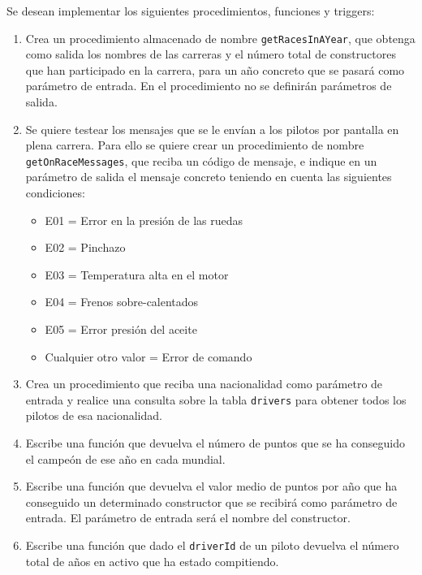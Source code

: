 \documentclass[a4paper]{article}
\begin{document}
Se desean implementar los siguientes procedimientos, funciones y triggers:

\begin{enumerate}
    \item Crea un procedimiento almacenado de nombre \texttt{getRacesInAYear}, que obtenga como salida los nombres de las carreras y el número total de constructores que han participado en la carrera, para un año concreto que se pasará como parámetro de entrada. En el procedimiento no se definirán parámetros de salida.  
    
    \item Se quiere testear los mensajes que se le envían a los pilotos por pantalla en plena carrera. Para ello se quiere crear un procedimiento de nombre \texttt{getOnRaceMessages}, que reciba un código de mensaje, e indique en un parámetro de salida el mensaje concreto teniendo en cuenta las siguientes condiciones:
    \begin{itemize}
        \item E01 = Error en la presión de las ruedas
        \item E02 = Pinchazo
        \item E03 = Temperatura alta en el motor
        \item E04 = Frenos sobre-calentados
        \item E05 = Error presión del aceite
        \item Cualquier otro valor = Error de comando
    \end{itemize}
            
    \item Crea un procedimiento que reciba una nacionalidad como parámetro de entrada y realice una consulta sobre la tabla \texttt{drivers} para obtener todos los pilotos de esa nacionalidad.
       
    \item Escribe una función que devuelva el número de puntos que se ha conseguido el campeón de ese año en cada mundial.
           
    \item Escribe una función que devuelva el valor medio de puntos por año que ha conseguido un determinado constructor que se recibirá como parámetro de entrada. El parámetro de entrada será el nombre del constructor.
            
    \item Escribe una función que dado el \texttt{driverId} de un piloto devuelva el número total de años en activo que ha estado compitiendo.
      

\end{enumerate}
\end{document}
